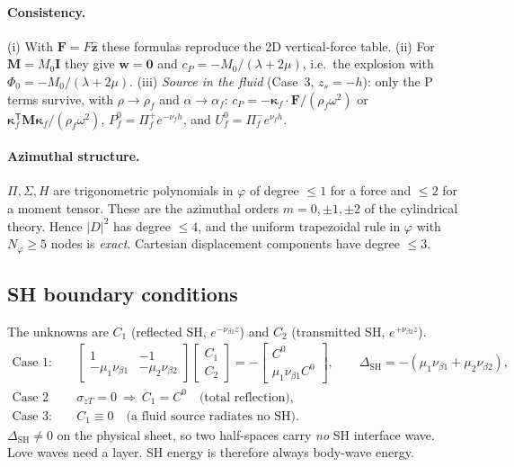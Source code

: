 \documentclass[11pt,a4paper]{article}
\begin{document}
\paragraph{Consistency.} (i) With $\mathbf F=F\hat{\mathbf z}$ these formulas reproduce the 2D
vertical-force table. (ii) For $\mathbf M=M_0\mathbf I$ they give $\mathbf w=\mathbf 0$ and
$c_P=-M_0/(\lambda+2\mu)$, i.e.\ the explosion with $\Phi_0=-M_0/(\lambda+2\mu)$.
(iii) \emph{Source in the fluid} (Case~3, $z_s=-h$): only the P terms survive, with
$\rho\to\rho_f$ and $\alpha\to\alpha_f$:
$c_P=-\bm\kappa_f\!\cdot\mathbf F/(\rho_f\omega^2)$ or
$\bm\kappa_f^{\mathsf T}\mathbf M\bm\kappa_f/(\rho_f\omega^2)$, $P_f^0=\Pi_f^{+}e^{-\nu_fh}$, and
$U_f^0=\Pi_f^{-}e^{\nu_fh}$.

\paragraph{Azimuthal structure.} $\Pi,\Sigma,H$ are trigonometric polynomials in $\varphi$ of degree
$\le1$ for a force and $\le2$ for a moment tensor. These are the azimuthal orders $m=0,\pm1,\pm2$ of
the cylindrical theory. Hence $|D|^2$ has degree $\le4$, and the uniform trapezoidal rule in
$\varphi$ with $N_\varphi\ge5$ nodes is \emph{exact}. Cartesian displacement components have degree
$\le3$.

\subsection{SH boundary conditions}

The unknowns are $C_1$ (reflected SH, $e^{-\nu_{\beta1}z}$) and $C_2$ (transmitted SH, $e^{+\nu_{\beta2}z}$).
\begin{align}
  \text{Case 1:}&\quad
  \begin{bmatrix}1 & -1\\ -\mu_1\nu_{\beta1} & -\mu_2\nu_{\beta2}\end{bmatrix}
  \begin{bmatrix}C_1\\ C_2\end{bmatrix}=-\begin{bmatrix}C^0\\ \mu_1\nu_{\beta1}C^0\end{bmatrix},
  \qquad \Delta_{\mathrm{SH}}=-(\mu_1\nu_{\beta1}+\mu_2\nu_{\beta2}),\\
  \text{Case 2 and free surface:}&\quad \sigma_{zT}=0\ \Rightarrow\ C_1=C^0\quad\text{(total reflection)},\\
  \text{Case 3:}&\quad C_1\equiv0\quad\text{(a fluid source radiates no SH)}.
\end{align}
$\Delta_{\mathrm{SH}}\neq0$ on the physical sheet, so two half-spaces carry \emph{no} SH interface wave.
Love waves need a layer. SH energy is therefore always body-wave energy.
\end{document}
